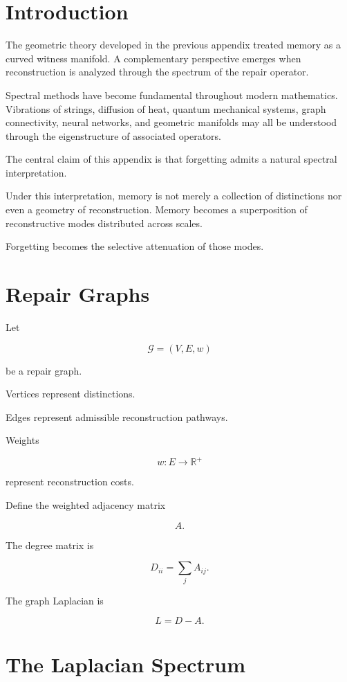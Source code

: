 \documentclass[12pt,oneside]{book}
\theoremstyle{plain} \newtheorem{theorem}{Theorem}[chapter] \newtheorem{lemma}[theorem]{Lemma} \newtheorem{proposition}[theorem]{Proposition} \newtheorem{corollary}[theorem]{Corollary}
\theoremstyle{definition} \newtheorem{definition}[theorem]{Definition} \newtheorem{axiom}[theorem]{Axiom} \newtheorem{construction}[theorem]{Construction}
\theoremstyle{remark} \newtheorem{remark}[theorem]{Remark} \newtheorem{example}[theorem]{Example}
\begin{document}
\section{Introduction}

The geometric theory developed in the previous appendix treated memory as a curved witness manifold. A complementary perspective emerges when reconstruction is analyzed through the spectrum of the repair operator.

Spectral methods have become fundamental throughout modern mathematics. Vibrations of strings, diffusion of heat, quantum mechanical systems, graph connectivity, neural networks, and geometric manifolds may all be understood through the eigenstructure of associated operators.

The central claim of this appendix is that forgetting admits a natural spectral interpretation.

Under this interpretation, memory is not merely a collection of distinctions nor even a geometry of reconstruction. Memory becomes a superposition of reconstructive modes distributed across scales.

Forgetting becomes the selective attenuation of those modes.

\section{Repair Graphs}

Let

\[
\mathcal G=(V,E,w)
\]

be a repair graph.

Vertices represent distinctions.

Edges represent admissible reconstruction pathways.

Weights

\[
w:E\rightarrow \mathbb R^+
\]

represent reconstruction costs.

Define the weighted adjacency matrix

\[
A.
\]

The degree matrix is

\[
D_{ii}
=
\sum_j A_{ij}.
\]

The graph Laplacian is

\[
L
=
D-A.
\]

\section{The Laplacian Spectrum}
\end{document}
